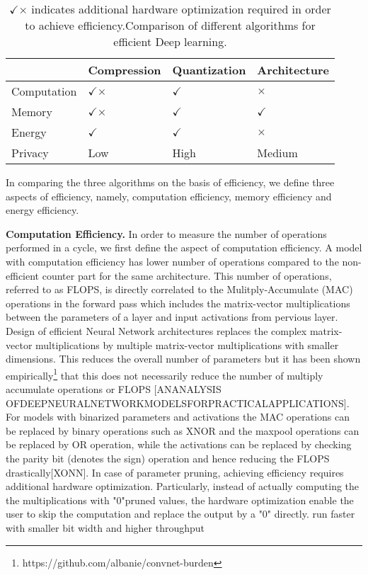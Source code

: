 \begin{table}[!htb]
\begin{center}
\renewcommand\arraystretch{1.5}
\fontsize{6.7pt}{6.7pt}\selectfont
\begin{tabular}{|l|l|l|l|}
\hline
 & Compression & Quantization & Architecture  \\
\hline
Computation & $\checkmark$$\times$  & $\checkmark$   & $\times$ \\
\hline
Memory &  $\checkmark$$\times$ & $\checkmark$   & $\checkmark$ \\
\hline
Energy &  $\checkmark$   & $\checkmark$   & $\times$ \\
\hline
Privacy &  Low   & High   & Medium \\
\hline
\end{tabular}
\end{center}
\caption{$\checkmark$$\times$ indicates additional hardware optimization required in order to achieve efficiency.Comparison of different algorithms for efficient Deep learning.}
\label{tbl:comparison}
\end{table}


In comparing the three algorithms on the basis of efficiency, we define three aspects of efficiency, namely, computation efficiency, memory efficiency and energy efficiency.

\noindent\textbf{Computation Efficiency.} In order to measure the number of operations performed in a cycle, we first define the aspect of computation efficiency.
A model with computation efficiency has lower number of operations compared to the non-efficient counter part for the same architecture.
This number of operations, referred to as FLOPS, is directly correlated to the Mulitply-Accumulate (MAC) operations in the forward pass which includes the matrix-vector multiplications between the parameters of a layer and input activations from pervious layer.
Design of efficient Neural Network architectures replaces the complex matrix-vector multiplications by multiple matrix-vector multiplications with smaller dimensions.
This reduces the overall number of parameters but it has been shown empirically\footnote{https://github.com/albanie/convnet-burden} that this does not necessarily reduce the number of multiply accumulate operations or FLOPS [ANANALYSIS  OFDEEPNEURALNETWORKMODELSFORPRACTICALAPPLICATIONS].
For models with binarized parameters and activations the MAC operations can be replaced by binary operations such as XNOR and the maxpool operations can be replaced by OR operation, while the activations can be replaced by checking the parity bit (denotes the sign) operation and hence reducing the FLOPS drastically[XONN].
In case of parameter pruning, achieving efficiency requires additional hardware optimization. Particularly, instead of actually computing the the multiplications with "0"pruned values, the hardware optimization enable the user to skip the computation and replace the output by a "0" directly.
run faster with smaller bit width and higher throughput

